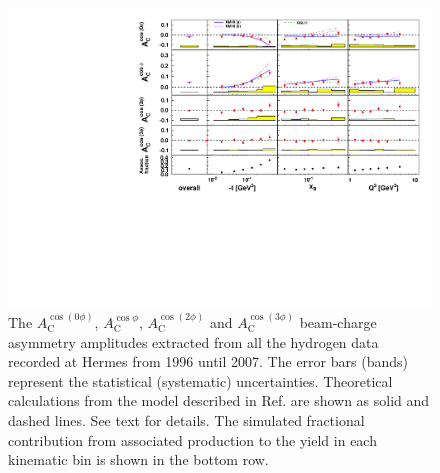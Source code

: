 \begin{figure}
  \begin{center}
    \includegraphics[width=15cm]{bcaplots_eml_par13_bin6_all_release_pic_cluster_update_withassoc_dual}
    \caption{The $A_{\textrm{C}}^{\cos(0\phi)}$, $A_{\textrm{C}}^{\cos\phi}$, $A_{\textrm{C}}^{\cos(2\phi)}$ and $A_{\textrm{C}}^{\cos(3\phi)}$ beam-charge asymmetry amplitudes extracted from all the hydrogen data recorded at H{\sc ermes} from 1996 until 2007. The error bars (bands) represent the statistical (systematic) uncertainties.  Theoretical calculations from the model described in Ref. \cite{Kum09} are shown as solid and dashed lines. See text for details. The simulated fractional contribution from associated production to the yield in each kinematic bin is shown in the bottom row.}
  \label{bca_xbjrange}
 \end{center}
\end{figure}

